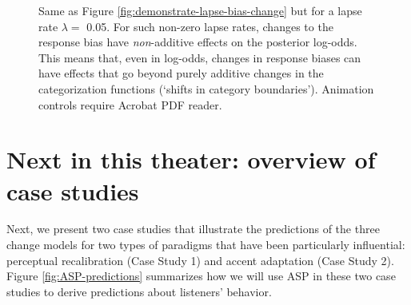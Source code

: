 \documentclass[
  11pt,
  man,floatsintext]{apa6}
\begin{document}
\begin{figure}

{\centering {}

}

\caption[Same as Figure \ref{fig:demonstrate-lapse-bias-change} but for a lapse rate \(\lambda=\) 0.05. For such non-zero lapse rates, changes to the response bias have \emph{non}-additive effects on the posterior log-odds. This means that, even in log-odds, changes in response biases can have effects that go beyond purely additive changes in the categorization functions (`shifts in category boundaries'). Animation controls require Acrobat PDF reader.]{Same as Figure \ref{fig:demonstrate-lapse-bias-change} but for a lapse rate \(\lambda=\) 0.05. For such non-zero lapse rates, changes to the response bias have \emph{non}-additive effects on the posterior log-odds. This means that, even in log-odds, changes in response biases can have effects that go beyond purely additive changes in the categorization functions (`shifts in category boundaries'). Animation controls require Acrobat PDF reader.}\label{fig:demonstrate-lapse-bias-change-nonzero-lapse}
\end{figure}

\hypertarget{next-in-this-theater-overview-of-case-studies}{%
\section{Next in this theater: overview of case studies}\label{next-in-this-theater-overview-of-case-studies}}

Next, we present two case studies that illustrate the predictions of the three change models for two types of paradigms that have been particularly influential: perceptual recalibration (Case Study 1) and accent adaptation (Case Study 2). Figure \ref{fig:ASP-predictions} summarizes how we will use ASP in these two case studies to derive predictions about listeners' behavior.
\end{document}
